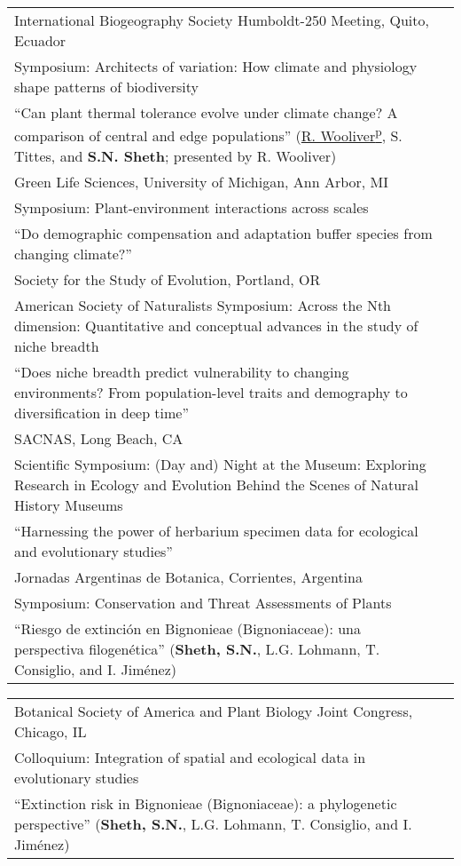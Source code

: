 \documentclass[11pt,english]{article}\usepackage[]{graphicx}\usepackage[]{color}
\providecommand{\tabularnewline}{\\}
\begin{document}
\renewcommand{\arraystretch}{1.2}
\begin{tabularx}{\textwidth}{@{}>{\raggedright}p{5.25in} >{\raggedleft}X@{}}

International Biogeography Society Humboldt-250 Meeting, Quito, Ecuador & 2019 \tabularnewline
\addtolength{\leftskip}{5ex} Symposium: Architects of variation: How climate and physiology shape patterns of biodiversity  \tabularnewline
\addtolength{\leftskip}{5ex} ``Can plant thermal tolerance evolve under climate change? A comparison of central and edge populations'' (\underline{R. Wooliver\textsuperscript{p}}, S. Tittes, and \textbf{S.N. Sheth}; presented by R. Wooliver)
\tabularnewline

Green Life Sciences, University of Michigan, Ann Arbor, MI & 2018 \tabularnewline
\addtolength{\leftskip}{5ex} Symposium: Plant-environment interactions across scales  \tabularnewline
\addtolength{\leftskip}{5ex} ``Do demographic compensation and adaptation buffer species from changing climate?'' \tabularnewline

Society for the Study of Evolution, Portland, OR & 2017 \tabularnewline
\addtolength{\leftskip}{5ex} American Society of Naturalists Symposium: Across the Nth dimension: Quantitative and conceptual advances in the study of niche breadth  \tabularnewline
\addtolength{\leftskip}{5ex} ``Does niche breadth predict vulnerability to changing environments? From population-level traits and demography to diversification in deep time'' \tabularnewline

SACNAS, Long Beach, CA & 2016 \tabularnewline
\addtolength{\leftskip}{5ex} Scientific Symposium: (Day and) Night at the Museum: Exploring Research in Ecology and Evolution Behind the Scenes of Natural History Museums \tabularnewline
\addtolength{\leftskip}{5ex} ``Harnessing the power of herbarium specimen data for ecological and evolutionary studies'' \tabularnewline

Jornadas Argentinas de Botanica, Corrientes, Argentina & 2007 \tabularnewline
\addtolength{\leftskip}{5ex} Symposium: Conservation and Threat Assessments of Plants \tabularnewline
\addtolength{\leftskip}{5ex} ``Riesgo de extinci\'on en Bignonieae (Bignoniaceae): una perspectiva filogen\'etica'' (\textbf{Sheth, S.N.}, L.G. Lohmann, T. Consiglio, and I. Jim\'enez) \tabularnewline

\end{tabularx}

\renewcommand{\arraystretch}{1.2}
\begin{tabularx}{\textwidth}{@{}>{\raggedright}p{5.25in}>{\raggedleft}X@{}}

Botanical Society of America and Plant Biology Joint Congress, Chicago, IL & 2007 \tabularnewline
\addtolength{\leftskip}{5ex} \small{Colloquium: Integration of spatial and ecological data in evolutionary studies} \tabularnewline
\addtolength{\leftskip}{5ex} ``Extinction risk in Bignonieae (Bignoniaceae): a phylogenetic perspective'' (\textbf{Sheth, S.N.}, L.G. Lohmann, T. Consiglio, and I. Jim\'enez) \tabularnewline

\end{tabularx}
\vspace{-0.5ex}
\end{document}
